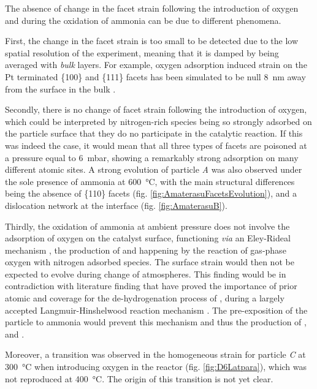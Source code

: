 The absence of change in the facet strain following the introduction of oxygen and during the oxidation of ammonia can be due to different phenomena.

First, the change in the facet strain is too small to be detected due to the low spatial resolution of the experiment, meaning that it is damped by being averaged with \textit{bulk} layers.
For example, oxygen adsorption induced strain on the Pt terminated \{100\} and \{111\} facets has been simulated to be null \qty{8}{\nm} away from the surface in the bulk \parencite{Kim2021}.

Secondly, there is no change of facet strain following the introduction of oxygen, which could be interpreted by nitrogen-rich species being so strongly adsorbed on the particle surface that they do no participate in the catalytic reaction.
If this was indeed the case, it would mean that all three types of facets are poisoned at a  pressure equal to \qty{6}{\milli\bar}, showing a remarkably strong adsorption on many different atomic sites.
A strong evolution of particle \textit{A} was also observed under the sole presence of ammonia at \qty{600}{\degreeCelsius}, with the main structural differences being the absence of \{110\} facets (fig. \ref{fig:AmaterasuFacetsEvolution}), and a dislocation network at the interface (fig. \ref{fig:AmaterasuB}).

Thirdly, the oxidation of ammonia at ambient pressure does not involve the adsorption of oxygen on the catalyst surface, functioning \textit{via} an Eley-Rideal mechanism \parencite{Rideal1939}, the production of  and  happening by the reaction of gas-phase oxygen with nitrogen adsorbed species.
The surface strain would then not be expected to evolve during change of atmospheres.
This finding would be in contradiction with literature finding that have proved the importance of prior atomic  and  coverage for the de-hydrogenation process of , during a largely accepted Langmuir-Hinshelwood reaction mechanism \parencite{Bradley1995, Mieher1995,vandenBroek1999, Kim2000}.
The pre-exposition of the particle to ammonia would prevent this mechanism and thus the production of ,  and .

Moreover, a transition was observed in the homogeneous strain for particle \textit{C} at \qty{300}{\degreeCelsius} when introducing oxygen in the reactor (fig. \ref{fig:D6Latpara}), which was not reproduced at \qty{400}{\degreeCelsius}.
The origin of this transition is not yet clear.

